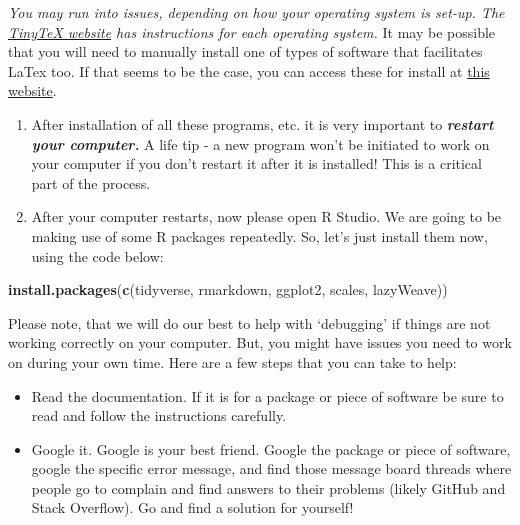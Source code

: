 \documentclass[
]{book}
\newenvironment{Shaded}{\begin{snugshade}}{\end{snugshade}}
\newcommand{\FunctionTok}[1]{\textcolor[rgb]{0.13,0.29,0.53}{\textbf{#1}}}
\newcommand{\NormalTok}[1]{#1}
\newcommand{\StringTok}[1]{\textcolor[rgb]{0.31,0.60,0.02}{#1}}
\begin{document}
\emph{You may run into issues, depending on how your operating system is set-up. The \href{https://yihui.org/tinytex/}{TinyTeX website} has instructions for each operating system.} It may be possible that you will need to manually install one of types of software that facilitates LaTex too. If that seems to be the case, you can access these for install at \href{https://www.latex-project.org/get/}{this website}.

\begin{enumerate}
\def\labelenumi{\arabic{enumi}.}
\setcounter{enumi}{5}
\item
  After installation of all these programs, etc. it is very important to \textbf{\emph{restart your computer.}} A life tip - a new program won't be initiated to work on your computer if you don't restart it after it is installed! This is a critical part of the process.
\item
  After your computer restarts, now please open R Studio. We are going to be making use of some R packages repeatedly. So, let's just install them now, using the code below:
\end{enumerate}

\begin{Shaded}
\begin{Highlighting}[]
\FunctionTok{install.packages}\NormalTok{(}\FunctionTok{c}\NormalTok{(}\StringTok{\textquotesingle{}tidyverse\textquotesingle{}}\NormalTok{, }\StringTok{\textquotesingle{}rmarkdown\textquotesingle{}}\NormalTok{, }\StringTok{\textquotesingle{}ggplot2\textquotesingle{}}\NormalTok{, }
                   \StringTok{\textquotesingle{}scales\textquotesingle{}}\NormalTok{, }\StringTok{\textquotesingle{}lazyWeave\textquotesingle{}}\NormalTok{))}
\end{Highlighting}
\end{Shaded}

Please note, that we will do our best to help with `debugging' if things are not working correctly on your computer. But, you might have issues you need to work on during your own time. Here are a few steps that you can take to help:

\begin{itemize}
\item
  Read the documentation. If it is for a package or piece of software be sure to read and follow the instructions carefully.
\item
  Google it. Google is your best friend. Google the package or piece of software, google the specific error message, and find those message board threads where people go to complain and find answers to their problems (likely GitHub and Stack Overflow). Go and find a solution for yourself!
\end{itemize}
\end{document}
